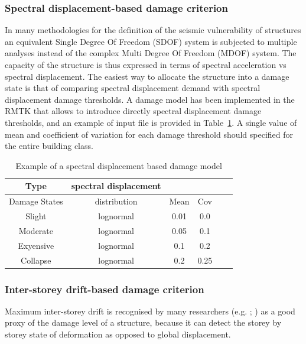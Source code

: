 \subsubsection{Spectral displacement-based damage criterion}
\label{subsubsec:sd-dmg}
In many methodologies for the definition of the seismic vulnerability of structures an equivalent Single Degree Of Freedom (SDOF) system is subjected to multiple analyses instead of the complex Multi Degree Of Freedom (MDOF) system. The capacity of the structure is thus expressed in terms of spectral acceleration vs spectral displacement. The easiest way to allocate the structure into a damage state is that of comparing spectral displacement demand with spectral displacement damage thresholds. A damage model has been implemented in the RMTK that allows to introduce directly spectral displacement damage thresholds, and an example of input file is provided in Table~\ref{table:sd-dmg}. A single value of mean and coefficient of variation for each damage threshold should specified for the entire building class.

\begin {table}[htb]
\caption{Example of a spectral displacement based damage model}
\label{table:sd-dmg}
\begin{center}
  \begin{tabular}{ | c | c | c | c | c | c |}
  \hline
    Type & spectral displacement &  & \\ \hline
    Damage States & distribution & Mean & Cov \\ \hline
    Slight & lognormal & 0.01 & 0.0 \\ \hline
    Moderate & lognormal & 0.05  & 0.1 \\ \hline
    Exyensive & lognormal & 0.1  & 0.2 \\ \hline
    Collapse & lognormal & 0.2  & 0.25 \\ \hline
  \end{tabular}
\end{center}
\end{table}

\subsubsection{Inter-storey drift-based damage criterion}
\label{subsubsec:isd-dmg}
Maximum inter-storey drift is recognised by many researchers (e.g. \cite{VamvatsikosCornell2005}; \cite{RossettoElnashai2005}) as a good proxy of the damage level of a structure, because it can detect the storey by storey state of deformation as opposed to global displacement.

